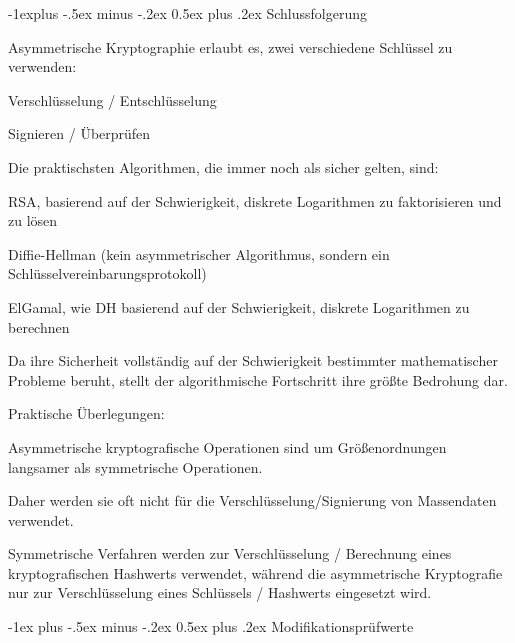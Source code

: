 \documentclass[a4paper]{article}
\makeatletter
\renewcommand{\section}{\@startsection{section}{1}{0mm}%
 {-1ex plus -.5ex minus -.2ex}%
 {0.5ex plus .2ex}%
 {\normalfont\large\bfseries}}
\renewcommand{\subsection}{\@startsection{subsection}{2}{0mm}%
 {-1explus -.5ex minus -.2ex}%
 {0.5ex plus .2ex}%
 {\normalfont\normalsize\bfseries}}
\makeatother
\begin{document}
\begin{multicols}{3}
      \subsection{Schlussfolgerung}
      \begin{itemize*}
            \item Asymmetrische Kryptographie erlaubt es, zwei verschiedene Schlüssel zu verwenden:
            \begin{itemize*}
                  \item Verschlüsselung / Entschlüsselung
                  \item Signieren / Überprüfen
            \end{itemize*}
            \item Die praktischsten Algorithmen, die immer noch als sicher gelten, sind:
            \begin{itemize*}
                  \item RSA, basierend auf der Schwierigkeit, diskrete Logarithmen zu faktorisieren und zu lösen
                  \item Diffie-Hellman (kein asymmetrischer Algorithmus, sondern ein Schlüsselvereinbarungsprotokoll)
                  \item ElGamal, wie DH basierend auf der Schwierigkeit, diskrete Logarithmen zu berechnen
            \end{itemize*}
            \item Da ihre Sicherheit vollständig auf der Schwierigkeit bestimmter mathematischer Probleme beruht, stellt der algorithmische Fortschritt ihre größte Bedrohung dar.
            \item Praktische Überlegungen:
            \begin{itemize*}
                  \item Asymmetrische kryptografische Operationen sind um Größenordnungen langsamer als symmetrische Operationen.
                  \item Daher werden sie oft nicht für die Verschlüsselung/Signierung von Massendaten verwendet.
                  \item Symmetrische Verfahren werden zur Verschlüsselung / Berechnung eines kryptografischen Hashwerts verwendet, während die asymmetrische Kryptografie nur zur Verschlüsselung eines Schlüssels / Hashwerts eingesetzt wird.
            \end{itemize*}
      \end{itemize*}

      \section{Modifikationsprüfwerte}

\end{multicols}
\end{document}
